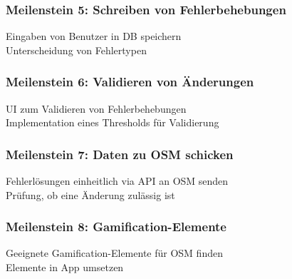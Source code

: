 \subsubsection{Meilenstein 5: Schreiben von Fehlerbehebungen}

\tick Eingaben von Benutzer in DB speichern \\
\tick Unterscheidung von Fehlertypen

\subsubsection{Meilenstein 6: Validieren von Änderungen}

\tick UI zum Validieren von Fehlerbehebungen \\
\tick Implementation eines Thresholds für Validierung

\subsubsection{Meilenstein 7: Daten zu OSM schicken}

\cross Fehlerlösungen einheitlich via API an OSM senden \\
\cross Prüfung, ob eine Änderung zulässig ist

\subsubsection{Meilenstein 8: Gamification-Elemente}

\tick Geeignete Gamification-Elemente für OSM finden \\
\tick Elemente in App umsetzen